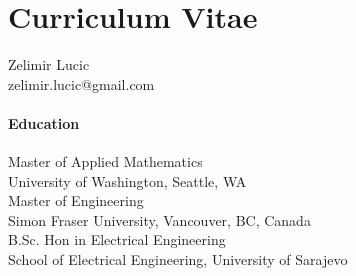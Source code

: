 ﻿\chapter*{Curriculum Vitae}
{}

Zelimir Lucic\\
zelimir.lucic@gmail.com \\

\subsubsection*{Education}

Master of Applied Mathematics\\						
University of Washington, Seattle, WA\\[2.em]

Master of Engineering\\						
Simon Fraser University, Vancouver, BC, Canada\\[2.em]

B.Sc. Hon in Electrical Engineering\\					
School of Electrical Engineering, University of Sarajevo

